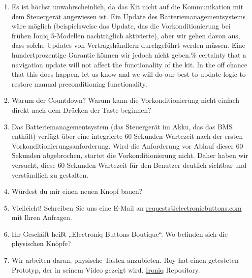 \documentclass[superscriptaddress,onecolumn,floatfix]{revtex4-2}
\begin{document}
\begin{enumerate}
  \item[A:] Es ist höchst unwahrscheinlich, da das Kit nicht auf die Kommunikation mit dem Steuergerät angewiesen ist. Ein Update des Batteriemanagementsystems wäre möglich (beispielsweise das Update, das die Vorkonditionierung bei frühen Ioniq 5-Modellen nachträglich aktivierte), aber wir gehen davon aus, dass solche Updates von Vertragshändlern durchgeführt werden müssen. Eine hundertprozentige Garantie können wir jedoch nicht geben.\% certainty that a navigation update will not affect the functionality of the kit. In the off chance that this does happen, let us know and we will do our best to update logic to restore manual preconditioning functionality.
  \item[Q:] Warum der Countdown? Warum kann die Vorkonditionierung nicht einfach direkt nach dem Drücken der Taste beginnen?
  \item[A:] Das Batteriemanagementsystem (das Steuergerät im Akku, das das BMS enthält) verfügt über eine integrierte 60-Sekunden-Wartezeit nach der ersten Vorkonditionierungsanforderung. Wird die Anforderung vor Ablauf dieser 60 Sekunden abgebrochen, startet die Vorkonditionierung nicht. Daher haben wir versucht, diese 60-Sekunden-Wartezeit für den Benutzer deutlich sichtbar und verständlich zu gestalten.
  \item[Q:] Würdest du mir einen neuen Knopf bauen?
  \item[A:] Vielleicht! Schreiben Sie uns eine E-Mail an \href{mailto:requests@electroniqbuttons.com}{requests@electronicbuttons.com} mit Ihren Anfragen.
  \item[Q:] Ihr Geschäft heißt „Electroniq Buttons Boutique“. Wo befinden sich die physischen Knöpfe?
  \item[A:] Wir arbeiten daran, physische Tasten anzubieten. Roy hat einen getesteten Prototyp, der in seinem Video gezeigt wird. \href{https://github.com/dragz/ironiq}{Ironiq} Repository.
\end{enumerate}
\appendix 

{}
\end{document}
